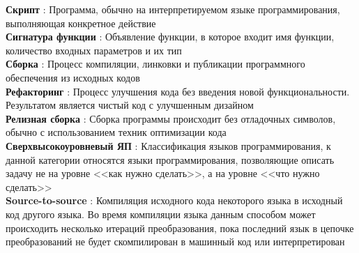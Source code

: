 \textbf{Скрипт}                  : Программа, обычно на интерпретируемом языке программирования, выполняющая конкретное действие                     \\
\textbf{Сигнатура функции}       : Объявление функции, в которое входит имя функции, количество входных параметров и их тип                          \\
\textbf{Сборка}                  : Процесс компиляции, линковки и публикации программного обеспечения из исходных кодов                              \\
\textbf{Рефакторинг}             : Процесс улучшения кода без введения новой функциональности. Результатом является чистый код с улучшенным дизайном \\
\textbf{Релизная сборка}         : Сборка программы происходит без отладочных символов, обычно с использованием техник оптимизации кода              \\
\textbf{Сверхвысокоуровневый ЯП} : Классификация языков программирования, к данной категории относятся языки программирования,
позволяющие описать задачу не на уровне <<как нужно сделать>>, а на уровне <<что нужно сделать>>                                                     \\
\textbf{Source-to-source} : Компиляция исходного кода некоторого языка в исходный код другого языка. Во время компиляции языка данным способом
 может происходить несколько итераций преобразования, пока последний язык в цепочке преобразований не будет скомпилирован в машинный код или интерпретирован\\
